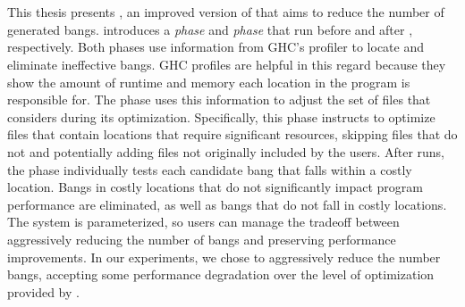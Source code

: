 
\section{\At{}}

This thesis presents \At{}, an improved version of \Ao{} that aims
to reduce the number of generated bangs.
\At{} introduces a \textit{\preopt{} phase} and
\textit{\postopt{} phase} that run before and after \Ao{},
respectively. Both phases use information from GHC's profiler to
locate and eliminate ineffective bangs.
GHC profiles are helpful in this regard because they
show the amount of runtime and memory each location in the
program is responsible for. The \preopt{} phase uses this information to adjust the set of files that
\Ao{} considers during its optimization.
Specifically, this phase instructs \Ao{} to
optimize files that contain locations that require significant
resources, skipping files that do not and
potentially adding files not originally included by the users.
After \Ao{} runs, the \postopt{} phase individually tests
each candidate bang that falls within a costly location. Bangs in costly locations that
do not significantly impact program performance are
eliminated, as well as bangs that do not fall in costly locations.   The system is parameterized, so users can manage the
tradeoff between aggressively reducing the number of bangs and
preserving performance improvements.  In our experiments, we chose to
aggressively reduce the number bangs, accepting some performance
degradation over the level of optimization provided by \Ao{}.

